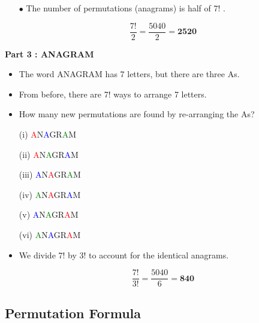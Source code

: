 \documentclass[]{report}
\begin{document}
	
	\begin{itemize}
		\item[$\bullet$]  The number of permutations (anagrams) is half of 7! .
		
		\[\frac{7!}{2} =  \frac{5040}{2} = \boldsymbol{2520} \]
	\end{itemize}
	
	\textbf{Part 3 : ANAGRAM}\\
	\begin{itemize}
		\item The word ANAGRAM has 7 letters, but there are three As.
		\item From before, there are 7! ways to arrange 7 letters.
		\item How many new permutations are found by re-arranging the As?
	\end{itemize}
	
	\begin{multicols}{2}
		\begin{itemize}
			\item[(i)]	\textcolor{red}{A}N\textcolor{blue}{A}GR\textcolor{green}{A}M 
			\item[(ii)]		\textcolor{red}{A}N\textcolor{green}{A}GR\textcolor{blue}{A}M 
			\item[(iii)] 		\textcolor{blue}{A}N\textcolor{red}{A}GR\textcolor{green}{A}M  
			\item[(iv)]		\textcolor{green}{A}N\textcolor{red}{A}GR\textcolor{blue}{A}M 
			\item[(v)]	\textcolor{blue}{A}N\textcolor{green}{A}GR\textcolor{red}{A}M 
			\item[(vi)]		\textcolor{green}{A}N\textcolor{blue}{A}GR\textcolor{red}{A}M 
		\end{itemize}
	\end{multicols}
	
	\begin{itemize}
		\item We divide 7! by 3! to account for the identical anagrams.
		
		\[\frac{7!}{3!} =  \frac{5040}{6} = \boldsymbol{840} \]
	\end{itemize}
	
	
	
	
	\subsection{Permutation Formula}
	
\end{document}
